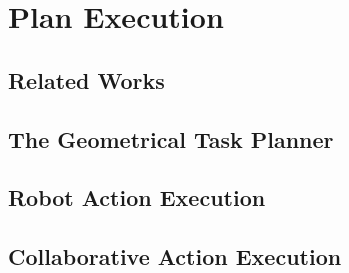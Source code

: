 
\chapter{Plan Execution} %

\label{chapter-plan_execution} %



\section{Related Works}

\section{The Geometrical Task Planner}

\section{Robot Action Execution} %

\section{Collaborative Action Execution} %








